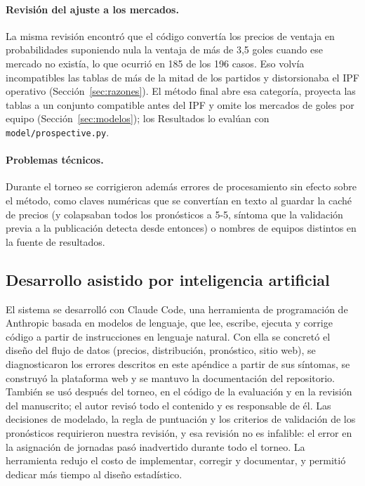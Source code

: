\documentclass[12pt]{article}
\theoremstyle{plain}
\theoremstyle{remark}
\begin{document}
\paragraph{Revisión del ajuste a los mercados.}
La misma revisión encontró que el código convertía los precios de
ventaja en probabilidades suponiendo nula la ventaja de más de 3,5
goles cuando ese mercado no existía, lo que ocurrió en 185 de los 196
casos.
Eso volvía incompatibles las tablas de más de la mitad de los
partidos y distorsionaba el IPF operativo (Sección~\ref{sec:razones}).
El método final abre esa categoría, proyecta las tablas a un conjunto
compatible antes del IPF y omite los mercados de goles por equipo
(Sección~\ref{sec:modelos}); los Resultados lo evalúan con
\texttt{model/prospective.py}.

\paragraph{Problemas técnicos.}
Durante el torneo se corrigieron además errores de procesamiento sin
efecto sobre el método, como claves numéricas que se convertían en
texto al guardar la caché de precios (y colapsaban todos los
pronósticos a 5-5, síntoma que la validación previa a la publicación
detecta desde entonces) o nombres de equipos distintos en la fuente de
resultados.

\subsection{Desarrollo asistido por inteligencia artificial}

El sistema se desarrolló con Claude Code, una herramienta de
programación de Anthropic basada en modelos de lenguaje, que lee,
escribe, ejecuta y corrige código a partir de instrucciones en
lenguaje natural.
Con ella se concretó el diseño del flujo de datos (precios, distribución,
pronóstico, sitio web), se diagnosticaron los errores descritos en este
apéndice a partir de sus síntomas, se construyó la plataforma web y se
mantuvo la documentación del repositorio.
También se usó después del torneo, en el código de la evaluación y en
la revisión del manuscrito; el autor revisó todo el contenido y es
responsable de él.
Las decisiones de modelado, la regla de puntuación y los criterios de
validación de los pronósticos requirieron nuestra revisión, y
esa revisión no es infalible: el error en la asignación de jornadas
pasó inadvertido durante todo el torneo.
La herramienta redujo el costo de implementar, corregir y documentar,
y permitió dedicar más tiempo al diseño estadístico.
\end{document}
